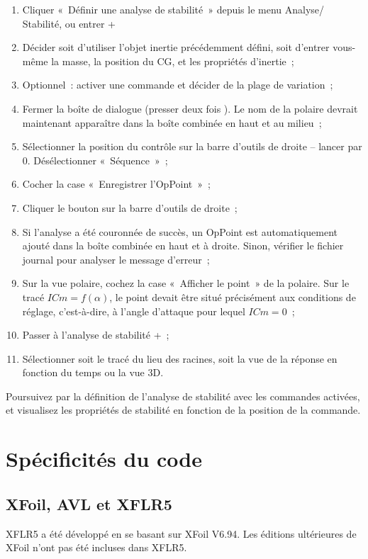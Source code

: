 \documentclass[a4paper,twoside,12pt,dvips]{article}
\begin{document}
\begin{enumerate}
	\item Cliquer «~Définir une analyse de stabilité~» depuis le menu Analyse/
	Stabilité, ou entrer  + 
	\item Décider soit d’utiliser l’objet inertie précédemment défini, soit 
	d’entrer vous-même la masse, la position du CG, et les propriétés 
	d’inertie~;
	\item Optionnel~: activer une commande et décider de la plage de variation~;
	\item Fermer la boîte de dialogue (presser deux fois ). Le 
	nom de la polaire devrait maintenant apparaître dans la boîte combinée en
	haut et au milieu~;
	\item Sélectionner la position du contrôle sur la barre d’outils de droite 
	-- lancer par 0. Désélectionner «~Séquence~»~;
	\item Cocher la case «~Enregistrer l’OpPoint~»~;
	\item Cliquer le bouton  sur la barre d’outils de droite~;
	\item Si l’analyse a été couronnée de succès, un OpPoint est automatiquement
	ajouté dans la boîte combinée en haut et à droite. Sinon, vérifier le 
	fichier journal pour analyser le message d’erreur~;
	\item Sur la vue polaire, cochez la case «~Afficher le point~» de la 
	polaire. Sur le tracé $ICm=f(\alpha)$, le point devait être situé 
	précisément aux conditions de réglage, c’est-à-dire, à l’angle d’attaque 
	pour lequel $ICm=0$~;
	\item Passer à l’analyse de stabilité +~;
	\item Sélectionner soit le tracé du lieu des racines, soit la vue de la 
	réponse en fonction du temps ou la vue 3D.
\end{enumerate}

Poursuivez par la définition de l’analyse de stabilité avec les commandes activées, et visualisez les propriétés de stabilité en fonction de la position de la commande.

\clearpage

\section{Spécificités du code}

\subsection{XFoil, AVL et XFLR5}
XFLR5 a été développé en se basant sur XFoil V6.94. Les éditions ultérieures
de XFoil n’ont pas été incluses dans XFLR5.
\end{document}
